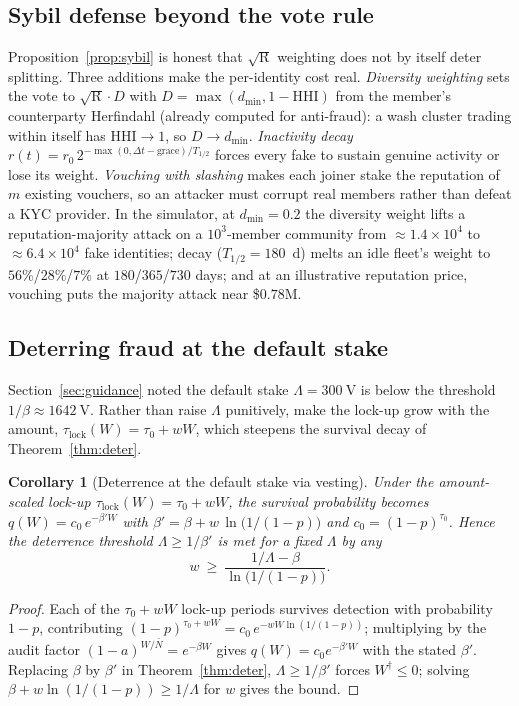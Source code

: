 \documentclass[11pt]{article}
\theoremstyle{plain}
\newtheorem{corollary}{Corollary}
\theoremstyle{definition}
\theoremstyle{remark}
\newcommand{\V}{\mathrm{V}}
\newcommand{\R}{\mathrm{R}}
\begin{document}
\subsection{Sybil defense beyond the vote rule}

Proposition~\ref{prop:sybil} is honest that $\sqrt{\R}$ weighting does not by itself deter splitting. Three additions make the per-identity cost real. \emph{Diversity weighting} sets the vote to $\sqrt{\R}\cdot D$ with $D=\max(d_{\min},1-\mathrm{HHI})$ from the member's counterparty Herfindahl (already computed for anti-fraud): a wash cluster trading within itself has $\mathrm{HHI}\to1$, so $D\to d_{\min}$. \emph{Inactivity decay} $r(t)=r_0\,2^{-\max(0,\Delta t-\text{grace})/T_{1/2}}$ forces every fake to sustain genuine activity or lose its weight. \emph{Vouching with slashing} makes each joiner stake the reputation of $m$ existing vouchers, so an attacker must corrupt real members rather than defeat a KYC provider. In the simulator, at $d_{\min}=0.2$ the diversity weight lifts a reputation-majority attack on a $10^3$-member community from ${\approx}1.4\times10^4$ to ${\approx}6.4\times10^4$ fake identities; decay ($T_{1/2}=180$~d) melts an idle fleet's weight to $56\%$/$28\%$/$7\%$ at $180$/$365$/$730$ days; and at an illustrative reputation price, vouching puts the majority attack near \$$0.78$M.

\subsection{Deterring fraud at the default stake}

Section~\ref{sec:guidance} noted the default stake $\Lambda=300~\V$ is below the threshold $1/\beta\approx1642~\V$. Rather than raise $\Lambda$ punitively, make the lock-up grow with the amount, $\tau_{\mathrm{lock}}(W)=\tau_0+wW$, which steepens the survival decay of Theorem~\ref{thm:deter}.

\begin{corollary}[Deterrence at the default stake via vesting]\label{cor:vesting}
Under the amount-scaled lock-up $\tau_{\mathrm{lock}}(W)=\tau_0+wW$, the survival probability becomes $q(W)=c_0\,e^{-\beta' W}$ with $\beta'=\beta+w\,\ln\!\bigl(1/(1-p)\bigr)$ and $c_0=(1-p)^{\tau_0}$. Hence the deterrence threshold $\Lambda\ge1/\beta'$ is met for a fixed $\Lambda$ by any
\[
w\ \ge\ \frac{1/\Lambda-\beta}{\ln\!\bigl(1/(1-p)\bigr)} .
\]
\end{corollary}
\begin{proof}
Each of the $\tau_0+wW$ lock-up periods survives detection with probability $1-p$, contributing $(1-p)^{\tau_0+wW}=c_0\,e^{-wW\ln(1/(1-p))}$; multiplying by the audit factor $(1-a)^{W/\bar N}=e^{-\beta W}$ gives $q(W)=c_0e^{-\beta'W}$ with the stated $\beta'$. Replacing $\beta$ by $\beta'$ in Theorem~\ref{thm:deter}, $\Lambda\ge1/\beta'$ forces $W^\dagger\le0$; solving $\beta+w\ln(1/(1-p))\ge1/\Lambda$ for $w$ gives the bound.
\end{proof}
\end{document}
